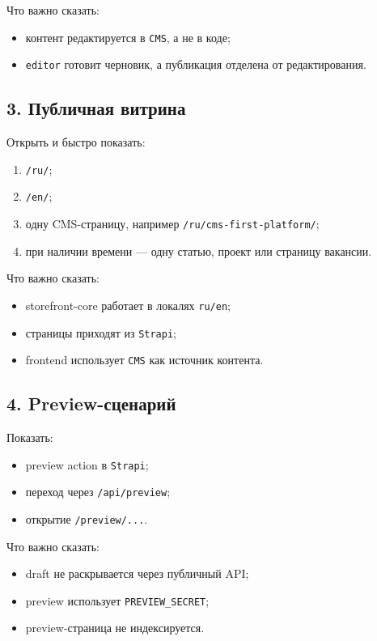 \documentclass[12pt,a4paper]{article}
\begin{document}
Что важно сказать:
\begin{itemize}
  \item контент редактируется в \texttt{CMS}, а не в коде;
  \item \texttt{editor} готовит черновик, а публикация отделена от редактирования.
\end{itemize}

\subsection*{3. Публичная витрина}

Открыть и быстро показать:
\begin{enumerate}
  \item \texttt{/ru/};
  \item \texttt{/en/};
  \item одну CMS-страницу, например \texttt{/ru/cms-first-platform/};
  \item при наличии времени --- одну статью, проект или страницу вакансии.
\end{enumerate}

Что важно сказать:
\begin{itemize}
  \item storefront-core работает в локалях \texttt{ru/en};
  \item страницы приходят из \texttt{Strapi};
  \item frontend использует \texttt{CMS} как источник контента.
\end{itemize}

\subsection*{4. Preview-сценарий}

Показать:
\begin{itemize}
  \item preview action в \texttt{Strapi};
  \item переход через \texttt{/api/preview};
  \item открытие \texttt{/preview/...}.
\end{itemize}

Что важно сказать:
\begin{itemize}
  \item draft не раскрывается через публичный API;
  \item preview использует \texttt{PREVIEW\_SECRET};
  \item preview-страница не индексируется.
\end{itemize}
\end{document}
